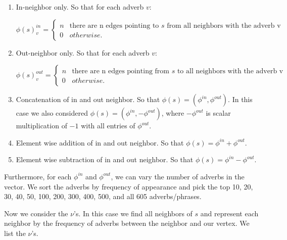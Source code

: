 \begin{enumerate}
	\item In-neighbor only. So that for each adverb $v$:

		\[   
		\phi(s)^{in}_v = \left\{
		\begin{array}{ll}
		      n & \text{there are n edges pointing to $s$ from all neighbors with the adverb v} \\
		      0 & otherwise.
		\end{array} 
		\right.
		\]

	\item Out-neighbor only. So that for each adverb $v$:

		\[   
		\phi(s)^{out}_v = \left\{
		\begin{array}{ll}
		      n & \text{there are n edges pointing from $s$ to all neighbors with the adverb v} \\
		      0 & otherwise.
		\end{array} 
		\right. 
		\]

	\item Concatenation of in and out neighbor. So that $\phi(s) = (\phi^{in}, \phi^{out})$. In this case we also considered $\phi(s) = (\phi^{in}, - \phi^{out})$, where $- \phi^{out}$ is scalar multiplication of $-1$ with all entries of $\phi^{out}$.

	\item Element wise addition of in and out neighbor. So that $\phi(s) = \phi^{in} + \phi^{out}$.
	
	\item Element wise subtraction of in and out neighbor. So that $\phi(s) = \phi^{in} - \phi^{out}$.

\end{enumerate}

Furthermore, for each $\phi^{in}$ and $\phi^{out}$, we can vary the number of adverbs in the vector. We sort the adverbs by frequency of appearance and pick the top 10, 20, 30, 40, 50, 100, 200, 300, 400, 500, and all 605 adverbs/phrases. 

Now we consider the $\nu$'s. In this case we find all neighbors of $s$ and represent each neighbor by the frequency of adverbs between the neighbor and our vertex. We list the $\nu$'s.

